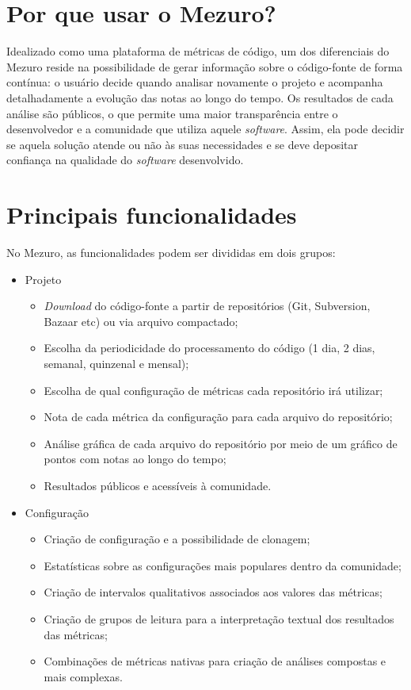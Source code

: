 \documentclass{llncs}
\begin{document}
\section{Por que usar o Mezuro?} \label{sec:projeto-mezuro}
Idealizado como uma plataforma de métricas de código, um dos diferenciais do Mezuro reside na possibilidade de gerar informação sobre o código-fonte de forma contínua: o usuário decide quando analisar novamente o projeto e acompanha detalhadamente a evolução das notas ao longo do tempo. Os resultados de cada análise são públicos, o que permite uma maior transparência entre o desenvolvedor e a comunidade que utiliza aquele \textit{software}. Assim, ela pode decidir se aquela solução atende ou não às suas necessidades e se deve depositar confiança na qualidade do \textit{software} desenvolvido.

\section{Principais funcionalidades}\label{sec:princ-funcionalidades}
No Mezuro, as funcionalidades podem ser divididas em dois grupos:
\begin{itemize}
  \item Projeto
    \begin{itemize}
    \item \textit{Download} do código-fonte a partir de repositórios (Git, Subversion, Bazaar etc) ou via arquivo compactado;
        \item Escolha da periodicidade do processamento do código (1 dia, 2 dias, semanal, quinzenal e mensal);
        \item Escolha de qual configuração de métricas cada repositório irá utilizar;
        \item Nota de cada métrica da configuração para cada arquivo do repositório;
        \item Análise gráfica de cada arquivo do repositório por meio de um gráfico de pontos com notas ao longo do tempo;
        \item Resultados públicos e acessíveis à comunidade.
    \end{itemize}
    \item Configuração
    \begin{itemize}
    \item Criação de configuração e a possibilidade de clonagem;
        \item Estatísticas sobre as configurações mais populares dentro da comunidade;
        \item Criação de intervalos qualitativos associados aos valores das métricas;
        \item Criação de grupos de leitura para a interpretação textual dos resultados das métricas;
        \item Combinações de métricas nativas para criação de análises compostas e mais complexas.
    \end{itemize}
\end{itemize}
\end{document}
